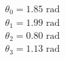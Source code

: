 \documentclass[preview]{standalone}
\begin{document}
\begin{align*}
\theta_0 = 1.85 \text{ rad}\\ \theta_1 = 1.99 \text{ rad}\\ \theta_2 = 0.80 \text{ rad}\\ \theta_3 = 1.13 \text{ rad}
\end{align*}
\end{document}
